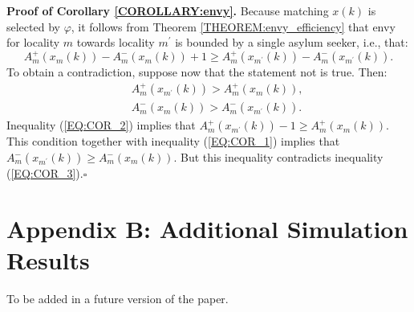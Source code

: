 \documentclass[12pt,fleqn]{article}
\begin{document}
\noindent\textbf{Proof of Corollary \ref{COROLLARY:envy}.} Because matching $x(k)$ is selected by $\varphi$, it follows from Theorem \ref{THEOREM:envy_efficiency} that envy for locality $m$ towards locality $m^\prime$ is bounded by a single asylum seeker, i.e., that:
\begin{equation}
A_m^+(x_m(k))-A_m^-(x_m(k))+1\geq A_m^+(x_{m^\prime}(k))-A_m^-(x_{m^\prime}(k)).\label{EQ:COR_1}
\end{equation}
\noindent To obtain a contradiction, suppose now that the statement not is true. Then:
\begin{eqnarray}
&& A_m^+(x_{m^\prime}(k))>A_m^+(x_m(k)),\label{EQ:COR_2} \\
&& A_m^-(x_m(k))>A_m^-(x_{m^\prime}(k)).\label{EQ:COR_3}
\end{eqnarray}
\noindent Inequality (\ref{EQ:COR_2}) implies that $A_m^+(x_{m^\prime}(k))-1\geq A_m^+(x_m(k))$. This condition together with inequality (\ref{EQ:COR_1}) implies that $A_m^-(x_{m^\prime}(k))\geq A_m^-(x_m(k))$. But this inequality contradicts inequality (\ref{EQ:COR_3}).\hfill $\square$

\section*{Appendix B: Additional Simulation Results}
To be added in a future version of the paper.



\end{document}
